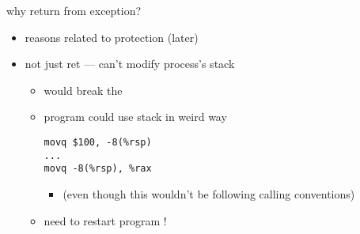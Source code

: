 
\begin{frame}[fragile,label=whyRFE]{why return from exception?}
\lstset{language=myasm}
\begin{itemize}
\item reasons related to protection (later)
\item not just ret --- can't modify process's stack
    \begin{itemize}
    \item would break the 
    \item program could use stack in weird way
\begin{lstlisting}
movq $100, -8(%rsp)
...
movq -8(%rsp), %rax
\end{lstlisting}
        \begin{itemize}
        \item (even though this wouldn't be following calling conventions)
        \end{itemize}
    \item need to restart program !
    \end{itemize}
\end{itemize}
\end{frame}



